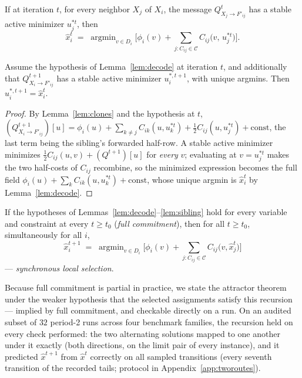 \begin{lemma}\label{lem:decode}
If at iteration $t$, for every neighbor $X_j$ of $X_i$, the message
$Q^{t}_{X_j \to F'_{ij}}$ has a stable active minimizer $u^{*t}_j$, then
\[
  \hat{x}^{t}_i \;=\; \operatorname{argmin}_{v \in D_i}
  \Big[\phi_i(v) + \sum_{j : C_{ij}\in\mathcal{C}}
  C_{ij}\big(v,\, u^{*t}_j\big)\Big].
\]
\end{lemma}

\begin{lemma}\label{lem:sibling}
Assume the hypothesis of Lemma~\ref{lem:decode} at iteration $t$, and
additionally that $Q^{t+1}_{X_i \to F'_{ij}}$ has a stable active
minimizer $u^{*,t+1}_i$, with unique argmins.  Then
$u^{*,t+1}_i = \hat{x}^{t}_i$.
\end{lemma}
\begin{proof}
By Lemma~\ref{lem:clones} and the hypothesis at $t$,
$(Q^{t+1}_{X_i \to F'_{ij}})[u] = \phi_i(u) + \sum_{k \neq j}
C_{ik}(u, u^{*t}_k) + \tfrac12 C_{ij}(u, u^{*t}_j) + \text{const}$, the
last term being the sibling's forwarded half-row.  A stable active
minimizer minimizes $\tfrac12 C_{ij}(u,v) + (Q^{t+1})[u]$ for
\emph{every} $v$; evaluating at $v = u^{*t}_j$ makes the two half-costs
of $C_{ij}$ recombine, so the minimized expression becomes the full field
$\phi_i(u) + \sum_{k} C_{ik}(u, u^{*t}_k) + \text{const}$, whose unique
argmin is $\hat{x}^{t}_i$ by Lemma~\ref{lem:decode}. \qedhere
\end{proof}

\begin{corollary}\label{cor:rule}
If the hypotheses of Lemmas~\ref{lem:decode}--\ref{lem:sibling} hold for
every variable and constraint at every $t \ge t_0$ (\emph{full
commitment}), then for all $t \ge t_0$, simultaneously for all $i$,
\[
  \hat{x}^{t+1}_i \;=\; \operatorname{argmin}_{v\in D_i}
  \Big[\phi_i(v) + \sum_{j : C_{ij}\in\mathcal{C}}
  C_{ij}\big(v, \hat{x}^{t}_j\big)\Big]
\]
--- \emph{synchronous local selection}.
\end{corollary}

Because full commitment is partial in practice, we state the attractor
theorem under the weaker hypothesis that the selected assignments satisfy
this recursion --- implied by full commitment, and checkable directly on
a run.  On an audited subset of $32$ period-2 runs across four benchmark
families, the recursion held on every check performed: the two
alternating solutions mapped to one another under it exactly (both
directions, on the limit pair of every instance), and it predicted
$\hat{x}^{t+1}$ from $\hat{x}^{t}$ correctly on all sampled transitions
(every seventh transition of the recorded tails; protocol in
Appendix~\ref{app:tworoutes}).

